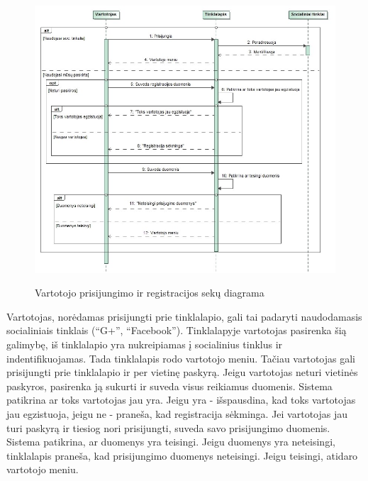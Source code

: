 \documentclass{VUMIFPSkursinis}
\begin{document}
\begin{figure}[H]
    \centering
    \includegraphics[scale=0.5]{img/geri/KlientPrisijungimas}
    \label{img:uml24}
	\caption{Vartotojo prisijungimo ir registracijos sekų diagrama}
\end{figure}

Vartotojas, norėdamas prisijungti prie tinklalapio, gali tai padaryti naudodamasis socialiniais tinklais (“G+”, “Facebook”). Tinklalapyje vartotojas pasirenka šią galimybę, iš tinklalapio yra nukreipiamas į socialinius tinklus ir indentifikuojamas. Tada tinklalapis rodo vartotojo meniu. Tačiau vartotojas gali prisijungti prie tinklalapio ir per vietinę paskyrą. Jeigu vartotojas neturi vietinės paskyros, pasirenka ją sukurti ir suveda visus reikiamus duomenis. Sistema patikrina ar toks vartotojas jau yra. Jeigu yra - išspausdina, kad toks vartotojas jau egzistuoja, jeigu ne - praneša, kad registracija sėkminga. Jei vartotojas jau turi paskyrą ir tiesiog nori prisijungti, suveda savo prisijungimo duomenis. Sistema patikrina, ar duomenys yra teisingi. Jeigu duomenys yra neteisingi, tinklalapis praneša, kad prisijungimo duomenys neteisingi. Jeigu teisingi, atidaro vartotojo meniu.
\end{document}

